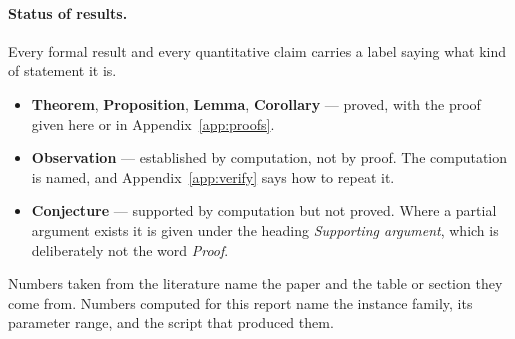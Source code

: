 \paragraph{Status of results.}
Every formal result and every quantitative claim carries a label saying what kind of
statement it is.

\begin{itemize}[topsep=3pt,itemsep=1pt]
  \item \textbf{Theorem}, \textbf{Proposition}, \textbf{Lemma}, \textbf{Corollary}
  --- proved, with the proof given here or in Appendix~\ref{app:proofs}.
  \item \textbf{Observation} --- established by computation, not by proof. The
  computation is named, and Appendix~\ref{app:verify} says how to repeat it.
  \item \textbf{Conjecture} --- supported by computation but not proved. Where a
  partial argument exists it is given under the heading \emph{Supporting
  argument}, which is deliberately not the word \emph{Proof}.
\end{itemize}

\noindent
Numbers taken from the literature name the paper and the table or section they
come from. Numbers computed for this report name the instance family, its
parameter range, and the script that produced them.
